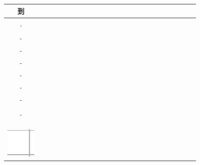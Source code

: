 \documentclass[10pt]{article}
\begin{document}
\begin{center}
\begin{tabular}{|c|c|c|c|c|c|c|c|c|c|c|c|c|c|c|c|c|c|c|c|c|c|c|c|}
\hline
到 &  &  &  &  &  &  &  &  &  &  &  &  &  &  &  &  &  &  &  &  &  &  &  \\
\hline
, &  &  &  &  &  &  &  &  &  &  &  &  &  &  &  &  &  &  &  &  &  &  &  \\
\hline
 &  &  &  &  &  &  &  &  &  &  &  &  &  &  &  &  &  &  &  &  &  &  &  \\
\hline
- &  &  &  &  &  &  &  &  &  &  &  &  &  &  &  &  &  &  &  &  &  &  &  \\
\hline
- &  &  &  &  &  &  &  &  &  &  &  &  &  &  &  &  &  &  &  &  &  &  &  \\
\hline
- &  &  &  &  &  &  &  &  &  &  &  &  &  &  &  &  &  &  &  &  &  &  &  \\
\hline
- &  &  &  &  &  &  &  &  &  &  &  &  &  &  &  &  &  &  &  &  &  &  &  \\
\hline
- &  &  &  &  &  &  &  &  &  &  &  &  &  &  &  &  &  &  &  &  &  &  &  \\
\hline
- &  &  &  &  &  &  &  &  &  &  &  &  &  &  &  &  &  &  &  &  &  &  &  \\
\hline
 &  &  &  &  &  &  &  &  &  &  &  &  &  &  &  &  &  &  &  &  &  &  &  \\
\hline
- &  &  &  &  &  &  &  &  &  &  &  &  &  &  &  &  &  &  &  &  &  &  &  \\
\hline
 &  &  &  &  &  &  &  &  &  &  &  &  &  &  &  &  &  &  &  &  &  &  &  \\
\hline
 &  &  &  &  &  &  &  &  &  &  &  &  &  &  &  &  &  &  &  &  &  &  &  \\
\hline
 &  &  &  &  &  &  &  &  &  &  &  &  &  &  &  &  &  &  &  &  &  &  &  \\
\hline
\includegraphics[max width=\textwidth]{2024_11_21_439e1d90cd1e7f928ae2g-15(1)}

\end{tabular}
\end{center}
\end{document}

